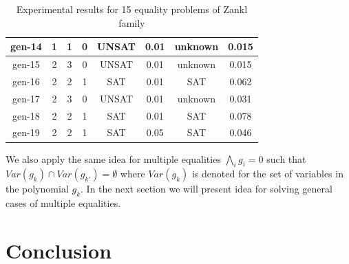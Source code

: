 \documentclass[runningheads,a4paper,oribibl]{llncs}
\begin{document}
{{\begin{table}
{\begin{tabular}[b]{|c|c|c|c|c|c|c|c|}
\hline
gen-14 & 1 & 1 & 0& UNSAT &0.01 & unknown &0.015\\
\hline
gen-15 & 2 & 3 & 0& UNSAT &0.01 & unknown &0.015\\
\hline
gen-16 & 2 & 2 & 1& SAT &0.01 & SAT &0.062\\
\hline
gen-17 & 2 & 3 & 0& UNSAT &0.01 & unknown &0.031\\
\hline
gen-18 & 2 & 2 & 1& SAT &0.01 & SAT &0.078\\
\hline
gen-19 & 2 & 2 & 1& SAT &0.05 & SAT &0.046\\
\hline
\end{tabular}
}
\caption{Experimental results for 15 equality problems of Zankl family}
\label{tab:eqexp}
\end{table}

We also apply the same idea for multiple equalities $\bigwedge \limits_{i} g_i = 0$ such that $Var(g_k) \cap Var(g_{k'}) = \emptyset$ where $Var(g_k)$ is denoted for the set of variables in the polynomial $g_k$. In the next section we will present idea for solving general cases of multiple equalities.
}

}



\section{Conclusion} \label{sec:conclusion and Future Work}
\end{document}
